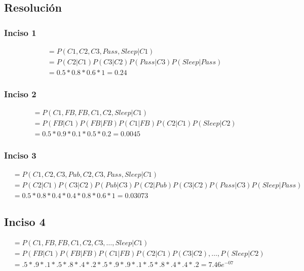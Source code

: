 \documentclass[12pt,a4paper]{article}
\begin{document}
\subsection{Resolución}

\subsubsection{Inciso 1}

\begin{align}
    \tag{1} &= P(C1,C2,C3,Pass,Sleep|C1) \\
    \tag{2} &= P(C2|C1)P(C3|C2)P(Pass|C3)P(Sleep|Pass)\\
    \tag{4} &= 0.5 * 0.8 * 0.6 * 1 = 0.24
\end{align}

\subsubsection{Inciso 2}

\begin{align}
\tag{1} &= P(C1,FB,FB,C1,C2,Sleep|C1) \\
\tag{2} &= P(FB|C1)P(FB|FB)P(C1|FB)P(C2|C1)P(Sleep|C2) \\
\tag{4} &= 0.5 * 0.9 * 0.1 * 0.5 * 0.2 = 0.0045 
\end{align}

\subsubsection{Inciso 3}

\begin{align}
\tag{1} &= P(C1,C2,C3,Pub,C2,C3,Pass,Sleep|C1) \\
\tag{2} &= P(C2|C1)P(C3|C2)P(Pub|C3)P(C2|Pub)P(C3|C2)P(Pass|C3)P(Sleep|Pass) \\
\tag{4} &= 0.5 * 0.8 * 0.4 * 0.4 * 0.8 * 0.6 * 1 = 0.03073
\end{align}

\subsection{Inciso 4}

\begin{align}
\tag{1} &= P(C1,FB,FB,C1,C2,C3,\dots ,Sleep|C1) \\
\tag{2} &= P(FB|C1)P(FB|FB)P(C1|FB)P(C2|C1)P(C3|C2),\dots,P(Sleep|C2) \\
\tag{4} &= .5 * .9 * .1 * .5 * .8 * .4 * .2 * .5 * .9 * .9 * .1 * .5 * .8 * .4 * .4 * .2 = 7.46e^{-07}
\end{align}
\end{document}
